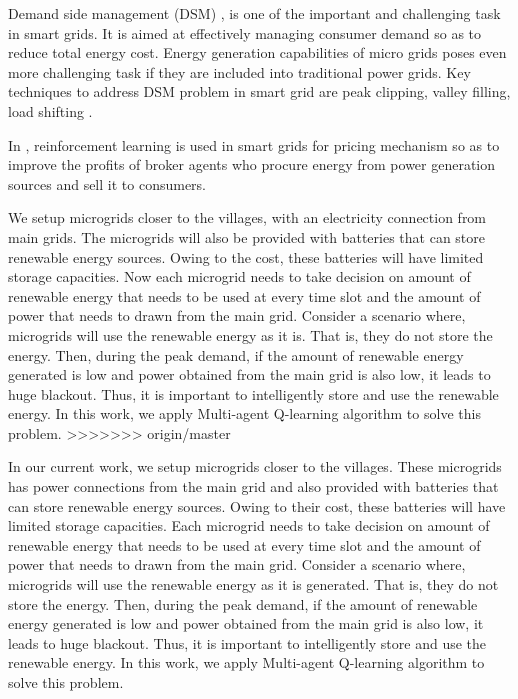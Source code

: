 \documentclass[conference]{IEEEtran}
\begin{document}
Demand side management (DSM) \cite{logenthiran2011multi, wang2010demand}, is one of the important and challenging task in smart grids. It is aimed at effectively managing consumer demand so as to  reduce total energy cost. Energy generation capabilities of micro grids poses even more challenging task if they are included into traditional power grids. Key techniques to address DSM problem in smart grid are peak clipping, valley filling,  load shifting \cite{maharjan2010demand}.

In  \cite{reddy2011learned, reddy2011strategy}, reinforcement learning is used in smart grids for pricing mechanism so as to improve the profits of broker agents who procure energy from power generation sources and sell it to consumers. 



We setup microgrids closer to the villages, with an electricity connection from main grids. The microgrids will also be provided with batteries that can store renewable energy sources. Owing to the cost, these batteries will have limited storage capacities. Now each microgrid needs to take decision on amount of renewable energy that needs to be used at every time slot and the amount of power that needs to drawn from the main grid. Consider a scenario where, microgrids will use the renewable energy as it is. That is, they do not store the energy. Then, during the peak demand, if the amount of renewable energy generated is low and power obtained from the main grid is also low, it leads to huge blackout. Thus, it is important to intelligently store and use the renewable energy. In this work, we apply Multi-agent Q-learning algorithm to solve this problem. 
>>>>>>> origin/master

In our current work, we setup microgrids closer to the villages. These microgrids has power connections from the main grid and also provided with batteries that can store renewable energy sources. Owing to their cost, these batteries will have limited storage capacities. Each microgrid needs to take decision on amount of renewable energy that needs to be used at every time slot and the amount of power that needs to drawn from the main grid. Consider a scenario where, microgrids will use the renewable energy as it is generated. That is, they do not store the energy. Then, during the peak demand, if the amount of renewable energy generated is low and power obtained from the main grid is also low, it leads to huge blackout. Thus, it is important to intelligently store and use the renewable energy. In this work, we apply Multi-agent Q-learning algorithm to solve this problem. 
\end{document}
